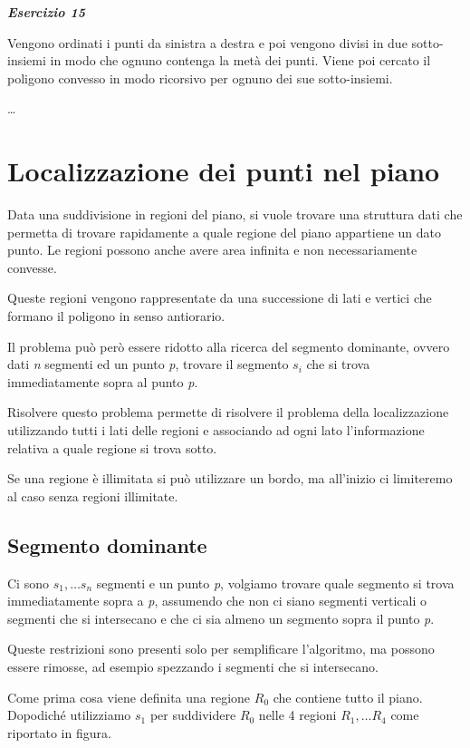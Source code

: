 \textbf{\textit{Esercizio 15}}

Vengono ordinati i punti da sinistra a destra e poi vengono divisi in due sotto-insiemi in modo che ognuno contenga la metà dei punti. 
Viene poi cercato il poligono convesso in modo ricorsivo per ognuno dei sue sotto-insiemi.

\ldots{}

\section{Localizzazione dei punti nel piano}\label{localizzazione-dei-punti-nel-piano}

Data una suddivisione in regioni del piano, si vuole trovare una struttura dati che permetta di trovare rapidamente a quale regione del piano appartiene un dato punto. 
Le regioni possono anche avere area infinita e non necessariamente convesse.

Queste regioni vengono rappresentate da una successione di lati e vertici che formano il poligono in senso antiorario.

Il problema può però essere ridotto alla ricerca del segmento dominante, ovvero dati \emph{n} segmenti ed un punto \emph{p}, trovare il segmento $s_i$ che si trova immediatamente sopra al punto \emph{p}.

Risolvere questo problema permette di risolvere il problema della localizzazione utilizzando tutti i lati delle regioni e associando ad ogni lato l'informazione relativa a quale regione si trova sotto.

Se una regione è illimitata si può utilizzare un bordo, ma all'inizio ci limiteremo al caso senza regioni illimitate.

\subsection{Segmento dominante}\label{segmento-dominante}

Ci sono $s_1,  \ldots s_n$ segmenti e un punto \emph{p}, volgiamo trovare quale segmento si trova immediatamente sopra a \emph{p}, assumendo che non ci siano segmenti verticali o segmenti che si intersecano e che ci sia almeno un segmento sopra il punto \emph{p}.

Queste restrizioni sono presenti solo per semplificare l'algoritmo, ma possono essere rimosse, ad esempio spezzando i segmenti che si intersecano.

Come prima cosa viene definita una regione $R_0$ che contiene tutto il piano. Dopodiché utilizziamo $s_1$ per suddividere $R_0$ nelle 4 regioni $R_1, \ldots R_4$ come riportato in figura.

